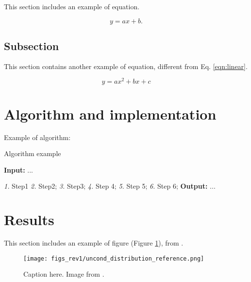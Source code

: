 \documentclass[a4paper,fleqn]{cas-sc}
\begin{document}
This section includes an example of equation. 
 
\begin{equation}
\label{eqn:linear}
    y=ax+b.
\end{equation}


\subsection{Subsection}

This section contains another example of equation, different from Eq.  \ref{eqn:linear}.

\begin{equation} 
\label{eqn:quadratic}
    y=ax^2+bx+c
\end{equation}

\section{Algorithm and implementation}

Example of algorithm:
\begin{algorithm}
  \caption{Algorithm example }
  
  \begin{algorithmic}
  \label{alg:Alg1}
  \State \textbf{Input:} ...
   \newline

 \Statex \textit{1.} Step1
  \Statex \textit{2.} Step2;
 \State \textit{3.}  Step3;
  \newline
   \State \textit{4.} Step 4;
   \State \textit{5.}  Step 5;
   \State \textit{6.} Step 6;
   \EndFor
  \EndFor 
  \newline
\State  \textbf{Output: } ... 
  \end{algorithmic} 
\end{algorithm} 


\section{Results}


This section includes an example of figure (Figure \ref{fig:Figure1}), from  \cite{de2021direct}.

\begin{figure}
\centering
\texttt{[image: figs\_rev1/uncond\_distribution\_reference.png]}
\caption{ Caption here. Image from \cite{de2021direct}.}
\label{fig:Figure1}
\end{figure}
\end{document}
